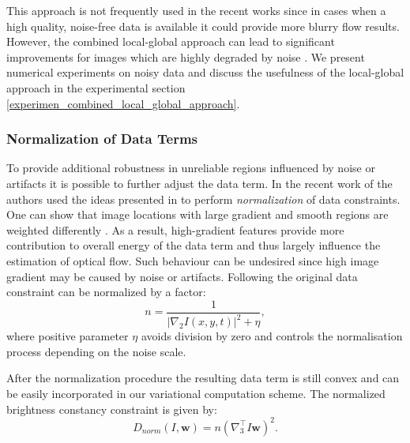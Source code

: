 This approach is not frequently used in the recent works since in cases when a high quality, noise-free data is available it could provide more blurry flow results. However, the combined local-global approach can lead to significant improvements for images which are highly degraded by noise \cite{Bruhn02, Bruhn05a}. We present numerical experiments on noisy data and discuss the usefulness of the local-global approach in the experimental section \ref{experimen_combined_local_global_approach}.


\subsubsection{Normalization of Data Terms}
\label{normalization}

To provide additional robustness in unreliable regions influenced by noise or artifacts it is possible to further adjust the data term.  In the recent work of  \cite{HarmonyFlow} the authors used the ideas presented in \cite{Simoncelli91, Lai98} to perform \textit{normalization} of data constraints. One can show that image locations with large gradient and smooth regions are weighted differently \cite{HarmonyFlow}. As a result, high-gradient features provide more contribution to overall energy of the data term and thus largely influence the estimation of optical flow. Such behaviour can be undesired since high image gradient may be caused by noise or artifacts.
Following \cite{Lai98, HarmonyFlow} the original data constraint can be normalized by a factor:
$$n =  \frac{1}{|\nabla_2 I(x,y,t)|^2 + \eta} , $$
where positive parameter $\eta$ avoids division by zero and controls the normalisation process depending on the noise scale. 



After the normalization procedure the resulting data term is still convex and can be easily incorporated in our variational computation scheme. The normalized brightness constancy constraint is given by:
$$ D_{norm}(I,\textbf{w}) = n (\nabla_{3}^{\top}I\textbf{w})^2.$$

